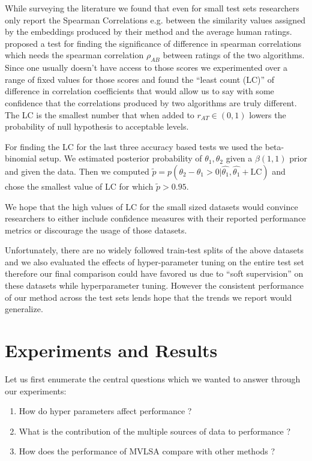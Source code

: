 \documentclass[11pt]{article}
\begin{document}
While surveying the literature we found that even for small test sets researchers only report the Spearman Correlations e.g. \cite{hill2014not,faruqui2014improving,faruqui2014retrofitting} between the similarity values assigned by the embeddings produced by their method and the
average human ratings. \cite{steiger1980tests} proposed a test for finding the significance of difference in spearman correlations which needs the spearman correlation $\rho_{AB}$ between ratings of the two algorithms. Since one usually doesn't have access to
those scores  we experimented over a range of fixed values for those
scores and found the ``least count (LC)'' of difference in correlation coefficients that would allow us to say with
some confidence that the correlations produced by two algorithms are
truly different. The LC is the smallest number that 
when added to $r_{AT} \in (0, 1)$ lowers the probability of null
hypothesis to acceptable levels.

For finding the LC for the last three accuracy based tests we
used the beta-binomial setup.  We estimated posterior
probability of $\theta_1, \theta_2$ given a $\beta(1,1)$ prior and
given the data. Then we computed $\tilde{p} = p(\theta_2 - \theta_1 >
0 | \hat{\theta_1}, \hat{\theta_1} + \textrm{LC})$ and chose
the smallest value of LC for which $\tilde{p} > 0.95$.

We hope that
the high values of LC for the small sized datasets would convince
researchers to either include confidence measures with their reported
performance metrics or discourage the usage of those datasets.

Unfortunately, there are no widely followed train-test splits of the above
datasets and we also evaluated the effects of hyper-parameter tuning
on the entire test set therefore our final comparison could have
favored us due to ``soft supervision'' on these datasets while
hyperparameter tuning. However the consistent performance of our
method across the test sets lends hope that the trends we report would
generalize. 

\section{Experiments and Results}
\label{sec:exp}
Let us first enumerate the central questions which we wanted to answer through
our experiments: 
\begin{enumerate}[leftmargin=*]
  \itemsep-0.1em 
\item How do hyper parameters affect performance ?
\item What is the contribution of the multiple sources of data to performance ?
\item How does the performance of MVLSA compare with other methods ?
\end{enumerate}
\end{document}
